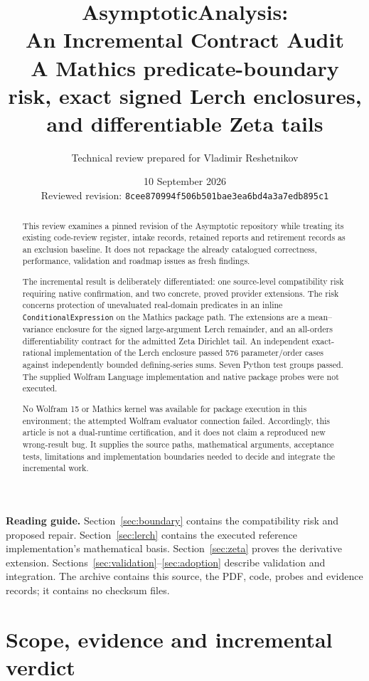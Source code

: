 \documentclass[11pt,a4paper]{article}
\title{\vspace{-1em}\textbf{AsymptoticAnalysis:\\An Incremental Contract Audit}\\[0.5em]
\large A Mathics predicate-boundary risk, exact signed Lerch enclosures,\\and differentiable Zeta tails}
\author{Technical review prepared for Vladimir Reshetnikov}
\date{10 September 2026\\[0.5em]\small Reviewed revision: \texttt{8cee870994f506b501bae3ea6bd4a3a7edb895c1}}
\newcommand{\code}[1]{\nolinkurl{#1}}
\begin{document}
\maketitle
\begin{abstract}
This review examines a pinned revision of the Asymptotic repository while treating its existing code-review register, intake records, retained reports and retirement records as an exclusion baseline. It does not repackage the already catalogued correctness, performance, validation and roadmap issues as fresh findings.

The incremental result is deliberately differentiated: one source-level compatibility risk requiring native confirmation, and two concrete, proved provider extensions. The risk concerns protection of unevaluated real-domain predicates in an inline \code{ConditionalExpression} on the Mathics package path. The extensions are a mean--variance enclosure for the signed large-argument Lerch remainder, and an all-orders differentiability contract for the admitted Zeta Dirichlet tail. An independent exact-rational implementation of the Lerch enclosure passed 576 parameter/order cases against independently bounded defining-series sums. Seven Python test groups passed. The supplied Wolfram Language implementation and native package probes were not executed.

No Wolfram 15 or Mathics kernel was available for package execution in this environment; the attempted Wolfram evaluator connection failed. Accordingly, this article is not a dual-runtime certification, and it does not claim a reproduced new wrong-result bug. It supplies the source paths, mathematical arguments, acceptance tests, limitations and implementation boundaries needed to decide and integrate the incremental work.
\end{abstract}
\vspace{0.3em}
\textbf{Reading guide.} Section~\ref{sec:boundary} contains the compatibility risk and proposed repair. Section~\ref{sec:lerch} contains the executed reference implementation's mathematical basis. Section~\ref{sec:zeta} proves the derivative extension. Sections~\ref{sec:validation}--\ref{sec:adoption} describe validation and integration. The archive contains this source, the PDF, code, probes and evidence records; it contains no checksum files.
\newpage
\setcounter{tocdepth}{1}
\tableofcontents
\newpage

\section{Scope, evidence and incremental verdict}\label{sec:scope}
\end{document}
